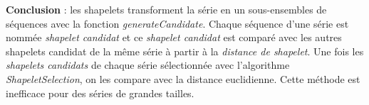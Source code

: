 {\bf Conclusion} : les shapelets transforment la s\'erie en un sous-ensembles de s\'equences avec la fonction {\em generateCandidate}. Chaque s\'equence d'une s\'erie est nomm\'ee {\em shapelet candidat} et ce {\em shapelet candidat} est compar\'e avec  les autres shapelets candidat de la m\^eme s\'erie \`a partir \`a la {\em distance de shapelet}. Une fois les {\em shapelets candidats} de chaque s\'erie s\'electionn\'ee avec l'algorithme {\em ShapeletSelection}, on les compare avec la distance euclidienne.
Cette m\'ethode est inefficace pour des s\'eries de grandes tailles.
%
%
%
%
